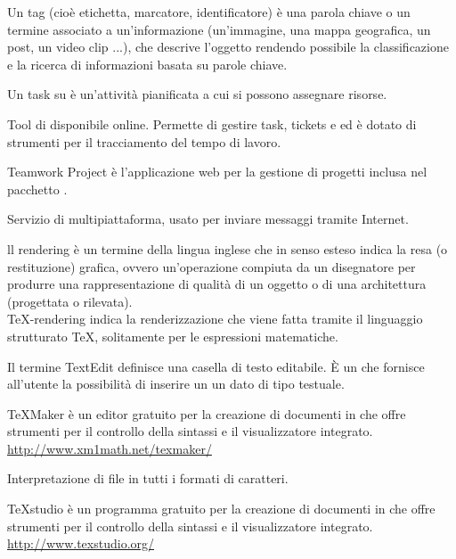 Un tag (cioè etichetta, marcatore, identificatore) è una parola chiave o un termine associato a un'informazione (un'immagine, una mappa geografica, un post, un video clip ...), che descrive l'oggetto rendendo possibile la classificazione e la ricerca di informazioni basata su parole chiave.

Un task su  è un’attività pianificata a cui si possono assegnare risorse.

Tool di  disponibile online. Permette di gestire  task, tickets e  ed è dotato di strumenti per il tracciamento del tempo di lavoro.

Teamwork Project è l’applicazione web per la gestione di progetti inclusa nel pacchetto .

Servizio di  multipiattaforma, usato per inviare messaggi tramite Internet.

ll rendering è un termine della lingua inglese che in senso esteso indica la resa (o restituzione) grafica, ovvero un'operazione compiuta da un disegnatore per produrre una rappresentazione di qualità di un oggetto o di una architettura (progettata o rilevata).\\
\TeX -rendering indica la renderizzazione che viene fatta tramite il linguaggio strutturato \TeX, solitamente per le espressioni matematiche.

Il termine TextEdit definisce una casella di testo editabile. È un  che fornisce all’utente la possibilità di inserire un un dato di tipo testuale.

TeXMaker è un editor gratuito per la creazione di documenti in \glossario{\LaTeX} che offre strumenti per il controllo della sintassi e il visualizzatore integrato.\\
\url{http://www.xm1math.net/texmaker/}

Interpretazione di file in tutti i formati di caratteri.

TeXstudio è un programma gratuito per la creazione di documenti in \glossario{\LaTeX} che offre strumenti per il controllo della sintassi e il visualizzatore integrato.\\
\url{http://www.texstudio.org/}

